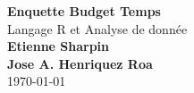 \documentclass[11pt]{article}
\begin{document}
\begin{titlepage}
  \begin{center}
    \vspace*{1cm} \Huge \textbf{Enquette Budget Temps}\\
    \vspace*{1\baselineskip} Langage R et Analyse de donnée\\
    \vspace*{2\baselineskip} \large
    \vfill \normalsize \textbf{Etienne Sharpin}\\ \textbf{Jose
      A. Henriquez Roa}\\
    \vspace*{2\baselineskip} \today \rhead{\today}
    \newpage
    \normalsize \tableofcontents
    \newpage
  \end{center}
\end{titlepage}

\end{document}
